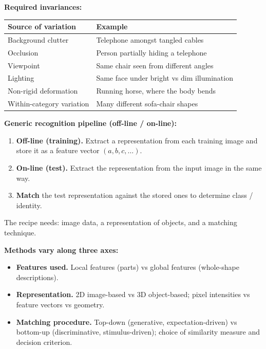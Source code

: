 \textbf{Required invariances:}

\begin{center}
\renewcommand{\arraystretch}{1.3}
\begin{tabular}{@{} l p{8cm} @{}}
\toprule
\textbf{Source of variation} & \textbf{Example} \\
\midrule
Background clutter & Telephone amongst tangled cables \\
Occlusion & Person partially hiding a telephone \\
Viewpoint & Same chair seen from different angles \\
Lighting & Same face under bright vs dim illumination \\
Non-rigid deformation & Running horse, where the body bends \\
Within-category variation & Many different sofa-chair shapes \\
\bottomrule
\end{tabular}
\end{center}

\separator

\textbf{Generic recognition pipeline (off-line / on-line):}

\begin{thmbox}
\begin{enumerate}
  \item \textbf{Off-line (training).} Extract a representation from each training image and store it as a feature vector $(a,b,c,\ldots)$.
  \item \textbf{On-line (test).} Extract the representation from the input image in the same way.
  \item \textbf{Match} the test representation against the stored ones to determine class / identity.
\end{enumerate}
The recipe needs: image data, a representation of objects, and a matching technique.
\end{thmbox}

\textbf{Methods vary along three axes:}
\begin{itemize}
  \item \textbf{Features used.} Local features (parts) vs global features (whole-shape descriptions).
  \item \textbf{Representation.} 2D image-based vs 3D object-based; pixel intensities vs feature vectors vs geometry.
  \item \textbf{Matching procedure.} Top-down (generative, expectation-driven) vs bottom-up (discriminative, stimulus-driven); choice of similarity measure and decision criterion.
\end{itemize}

